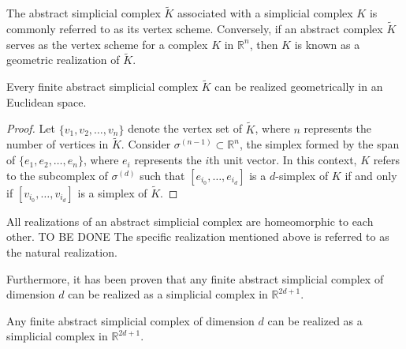 The abstract simplicial complex $\tilde{K}$ associated with a simplicial complex $K$ is commonly referred to as its vertex scheme. Conversely, if an abstract complex $\tilde{K}$ serves as the vertex scheme for a complex $K$ in $\mathbb{R}^n$, then $K$ is known as a geometric realization of $\tilde{K}$.

\begin{lemma}
Every finite abstract simplicial complex $\tilde{K}$ can be realized geometrically in an Euclidean space.
\end{lemma}

\begin{proof}
Let $\{v_1,v_2, \ldots, v_n\}$ denote the vertex set of $\tilde{K}$, where $n$ represents the number of vertices in $\tilde{K}$. Consider $\sigma^{(n-1)} \subset \mathbb{R}^n$, the simplex formed by the span of $\{e_1, e_2, \ldots, e_n\}$, where $e_i$ represents the $i$th unit vector. In this context, $K$ refers to the subcomplex of $\sigma^{(d)}$ such that $[e_{i_0}, \ldots, e_{i_d}]$ is a $d$-simplex of $K$ if and only if $[v_{i_0}, \ldots, v_{i_d}]$ is a simplex of $\tilde{K}$.
\end{proof}

\begin{remark}
All realizations of an abstract simplicial complex are homeomorphic to each other. TO BE DONE The specific realization mentioned above is referred to as the natural realization. 
\end{remark}

Furthermore, it has been proven that any finite abstract simplicial complex of dimension $d$ can be realized as a simplicial complex in $\mathbb{R}^{2d+1}$.

\begin{theorem}
Any finite abstract simplicial complex of dimension $d$ can be realized as a simplicial complex in $\mathbb{R}^{2d+1}$.
\end{theorem}

